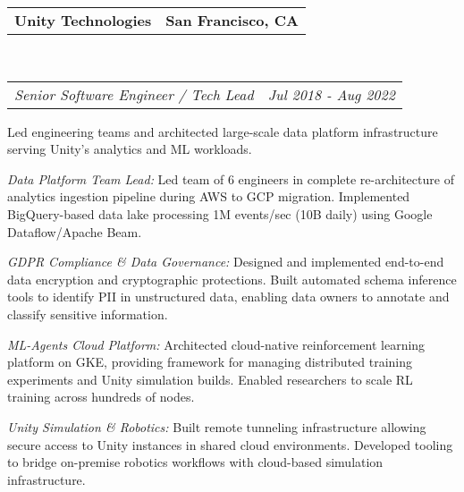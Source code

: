 \documentclass[12pt,letterpaper]{article}
\makeatletter
\newcommand{\area}[2]{\emph{#1:}   #2}
\newcommand{\headerrow}[2]
{\begin{tabular*}{\linewidth}{l@{\extracolsep{\fill}}r}
	#1 &
	#2 \\
\end{tabular*}}
\newcommand{\employment}[5]{
	\headerrow
		{\textbf{#1}}
		{\textbf{#2}}
	\\
	\headerrow
		{\emph{#3}}
		{\emph{#4}}
	\begin{itemize*}
		\item #5
	\end{itemize*}
}
\makeatother
\begin{document}
\employment{Unity Technologies}{San Francisco, CA}{Senior Software Engineer / Tech Lead}{Jul 2018 - Aug 2022}{
Led engineering teams and architected large-scale data platform infrastructure serving Unity's analytics and ML workloads.
\item \area{Data Platform Team Lead}{Led team of 6 engineers in complete re-architecture of analytics ingestion pipeline during AWS to GCP migration. Implemented BigQuery-based data lake processing 1M events/sec (10B daily) using Google Dataflow/Apache Beam.}
\item \area{GDPR Compliance \& Data Governance}{Designed and implemented end-to-end data encryption and cryptographic protections. Built automated schema inference tools to identify PII in unstructured data, enabling data owners to annotate and classify sensitive information.}
\item \area{ML-Agents Cloud Platform}{Architected cloud-native reinforcement learning platform on GKE, providing framework for managing distributed training experiments and Unity simulation builds. Enabled researchers to scale RL training across hundreds of nodes.}
\item \area{Unity Simulation \& Robotics}{Built remote tunneling infrastructure allowing secure access to Unity instances in shared cloud environments. Developed tooling to bridge on-premise robotics workflows with cloud-based simulation infrastructure.}
}
\end{document}
